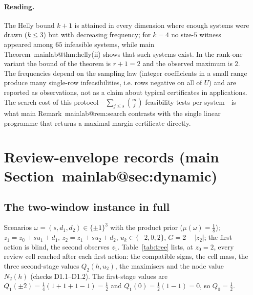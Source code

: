 \documentclass[11pt,a4paper]{article}
\makeatletter
\theoremstyle{plain}
\theoremstyle{definition}
\theoremstyle{remark}
\newcommand{\tfr}[2]{\tfrac{#1}{#2}}
\newcommand{\mref}[1]{\csname mainlab@#1\endcsname}
\makeatother
\begin{document}
\paragraph{Reading.} The Helly bound $k+1$ is attained in every dimension where enough systems were drawn ($k\le3$) but with decreasing frequency; for $k=4$ no size-$5$ witness appeared among $65$ infeasible systems, while main Theorem~\mref{thm:helly}(ii) shows that such systems exist. In the rank-one variant the bound of the theorem is $r+1=2$ and the observed maximum is $2$. The frequencies depend on the sampling law (integer coefficients in a small range produce many single-row infeasibilities, i.e. rows negative on all of $U$) and are reported as observations, not as a claim about typical certificates in applications. The search cost of this protocol---$\sum_{j\le s}\binom{m}{j}$ feasibility tests per system---is what main Remark~\mref{rem:search} contrasts with the single linear programme that returns a maximal-margin certificate directly.
\section{Review-envelope records (main Section~\mref{sec:dynamic})}\label{si:review}

\subsection{The two-window instance in full}
Scenarios $\omega=(s,d_1,d_2)\in\{\pm1\}^3$ with the product prior ($\mu(\omega)=\tfr18$); $z_1=z_0+su_1+d_1$, $z_2=z_1+su_2+d_2$, $u_k\in\{-2,0,2\}$, $G=2-|z_2|$; the first action is blind, the second observes $z_1$. Table~\ref{tab:tree} lists, at $z_0=2$, every review cell reached after each first action: the compatible signs, the cell mass, the three second-stage values $Q_2(h,u_2)$, the maximisers and the node value $N_2(h)$ (checks D1.1--D1.2). The first-stage values are $Q_1(\pm2)=\tfr14(1+1+1-1)=\tfr12$ and $Q_1(0)=\tfr12(1-1)=0$, so $Q_0=\tfr12$.
\end{document}
